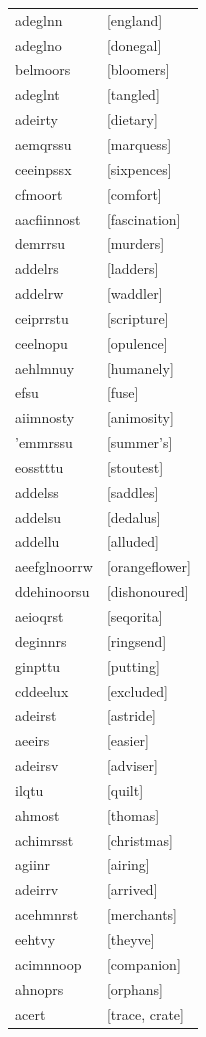 \documentclass{article}
\begin{document}
\begin{tabular}{ll}
adeglnn & [england] \\
adeglno & [donegal] \\
belmoors & [bloomers] \\
adeglnt & [tangled] \\
adeirty & [dietary] \\
aemqrssu & [marquess] \\
ceeinpssx & [sixpences] \\
cfmoort & [comfort] \\
aacfiinnost & [fascination] \\
demrrsu & [murders] \\
addelrs & [ladders] \\
addelrw & [waddler] \\
ceiprrstu & [scripture] \\
ceelnopu & [opulence] \\
aehlmnuy & [humanely] \\
efsu & [fuse] \\
aiimnosty & [animosity] \\
'emmrssu & [summer's] \\
eosstttu & [stoutest] \\
addelss & [saddles] \\
addelsu & [dedalus] \\
addellu & [alluded] \\
aeefglnoorrw & [orangeflower] \\
ddehinoorsu & [dishonoured] \\
aeioqrst & [seqorita] \\
deginnrs & [ringsend] \\
ginpttu & [putting] \\
cddeelux & [excluded] \\
adeirst & [astride] \\
aeeirs & [easier] \\
adeirsv & [adviser] \\
ilqtu & [quilt] \\
ahmost & [thomas] \\
achimrsst & [christmas] \\
agiinr & [airing] \\
adeirrv & [arrived] \\
acehmnrst & [merchants] \\
eehtvy & [theyve] \\
acimnnoop & [companion] \\
ahnoprs & [orphans] \\
acert & [trace, crate] \\

\end{tabular}
\end{document}
